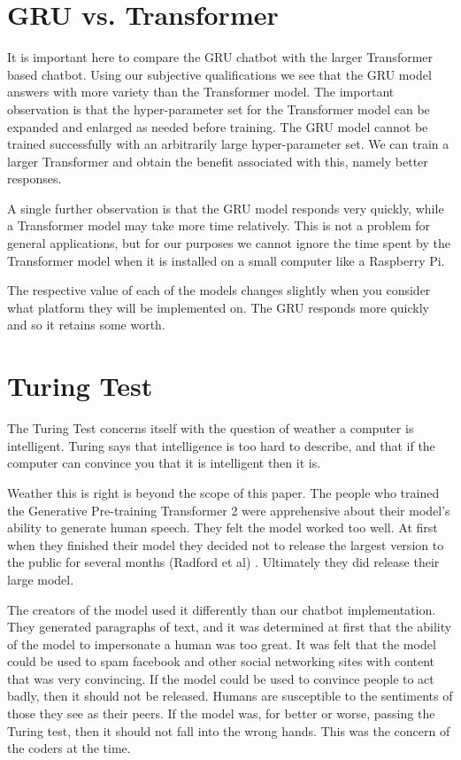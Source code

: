

\section{GRU vs. Transformer}
It is important here to compare the GRU chatbot with the larger Transformer based chatbot. Using our subjective qualifications we see that the GRU model answers with more variety than the Transformer model. The important observation is that the hyper-parameter set for the Transformer model can be expanded and enlarged as needed before training. The GRU model cannot be trained successfully with an arbitrarily large hyper-parameter set. We can train a larger Transformer and obtain the benefit associated with this, namely better responses.

A single further observation is that the GRU model responds very quickly, while a Transformer model may take more time relatively. This is not a problem for general applications, but for our purposes we cannot ignore the time spent by the Transformer model when it is installed on a small computer like a Raspberry Pi. 

The respective value of each of the models changes slightly when you consider what platform they will be implemented on. The GRU responds more quickly and so it retains some worth.


\section{Turing Test}

The Turing Test concerns itself with the question of weather a computer is intelligent. Turing says that intelligence is too hard to describe, and that if the computer can convince you that it is intelligent then it is.

Weather this is right is beyond the scope of this paper. The people who trained the Generative Pre-training Transformer 2 were apprehensive about their model's ability to generate human speech. They felt the model worked too well. At first when they finished their model they decided not to release the largest version to the public for several months (Radford et al) \cite{radford2019language}. Ultimately they did release their large model.

The creators of the model used it differently than our chatbot implementation. They generated paragraphs of text, and it was determined at first that the ability of the model to impersonate a human was too great. It was felt that the model could be used to spam facebook and other social networking sites with content that was very convincing. If the model could be used to convince people to act badly, then it should not be released. Humans are susceptible to the sentiments of those they see as their peers. If the model was, for better or worse, passing the Turing test, then it should not fall into the wrong hands. This was the concern of the coders at the time.


